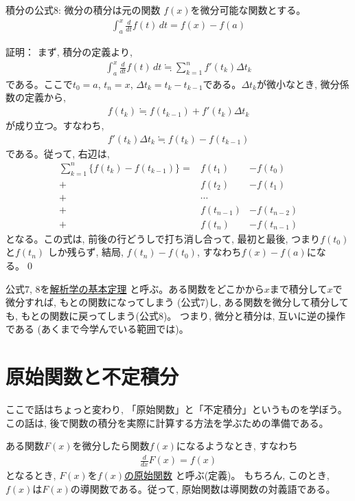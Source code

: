 \begin{itembox}{積分の公式8: 微分の積分は元の関数}
$f(x)$を微分可能な関数とする。
\begin{eqnarray}
\int_{a}^{x}\frac{d}{dt}f(t)\, dt=f(x)-f(a)\label{eq:integ_formula8}
\end{eqnarray}
\end{itembox}
証明： まず, 積分の定義より, 
\begin{eqnarray}
\int_{a}^{x}\frac{d}{dt}f(t)\, dt\fallingdotseq\sum_{k=1}^{n}f'(t_k)\Delta t_k\label{eq:int_8_0}
\end{eqnarray}
である。ここで$t_0=a$, $t_n=x$, $\Delta t_k=t_k-t_{k-1}$である。$\Delta t_k$が微小なとき, 微分係数の定義から, 
\begin{eqnarray}f(t_k) \fallingdotseq f(t_{k-1})+f'(t_k)\Delta t_k\end{eqnarray}
が成り立つ。すなわち, 
\begin{eqnarray}f'(t_k)\Delta t_k\fallingdotseq f(t_k)-f(t_{k-1})\end{eqnarray}
である。従って, 右辺は, 
\begin{eqnarray}
\sum_{k=1}^{n}\{f(t_k)-f(t_{k-1})\}
=&f(t_1)&-f(t_0)\nonumber\\
+&f(t_2)&-f(t_1)\nonumber\\
+&\cdots\nonumber\\
+&f(t_{n-1})&-f(t_{n-2})\nonumber\\
+&f(t_n)&-f(t_{n-1})\label{eq:int_8_1}
\end{eqnarray}
となる。この式は, 前後の行どうしで打ち消し合って, 最初と最後, つまり$f(t_0)$と$f(t_n)$
しか残らず, 結局, $f(t_n)-f(t_0)$, すなわち$f(x)-f(a)$になる。\qed
\mv

公式7, 8を\underline{解析学の基本定理}
と呼ぶ。ある関数をどこかから$x$まで積分して$x$で微分すれば, もとの関数になってしまう
(公式7)し, ある関数を微分して積分しても, もとの関数に戻ってしまう(公式8)。
つまり, 微分と積分は, 互いに逆の操作である (あくまで今学んでいる範囲では)。
\vv




\section{原始関数と不定積分}

ここで話はちょっと変わり, 「原始関数」と「不定積分」というものを学ぼう。
この話は, 後で関数の積分を実際に計算する方法を学ぶための準備である。

ある関数$F(x)$を微分したら関数$f(x)$になるようなとき, すなわち
\begin{eqnarray}
\frac{d}{dx}F(x)=f(x)\label{eq:def_genshikansu}
\end{eqnarray}
となるとき, $F(x)$を\underline{$f(x)$の原始関数} 
と呼ぶ(定義)。
もちろん, このとき, $f(x)$は$F(x)$の導関数である。従って, 
原始関数は導関数の対義語である。

